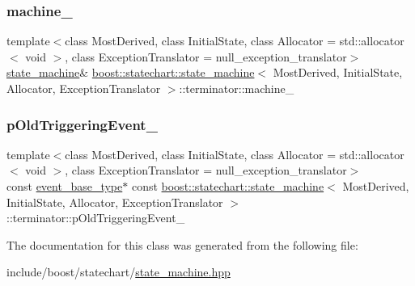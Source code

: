 \mbox{\label{classboost_1_1statechart_1_1state__machine_1_1terminator_abd7df485f3f9ddb47ebe9f33c272da87}} 
\subsubsection{\texorpdfstring{machine\+\_\+}{machine\_}}
{\footnotesize\ttfamily template$<$class Most\+Derived, class Initial\+State, class Allocator = std\+::allocator$<$ void $>$, class Exception\+Translator = null\+\_\+exception\+\_\+translator$>$ \\
\mbox{\hyperlink{classboost_1_1statechart_1_1state__machine}{state\+\_\+machine}}\& \mbox{\hyperlink{classboost_1_1statechart_1_1state__machine}{boost\+::statechart\+::state\+\_\+machine}}$<$ Most\+Derived, Initial\+State, Allocator, Exception\+Translator $>$\+::terminator\+::machine\+\_\+\hspace{0.3cm}{\ttfamily [private]}}

\mbox{\label{classboost_1_1statechart_1_1state__machine_1_1terminator_ac0daef6caf31d033aeeb43bedd491969}} 
\subsubsection{\texorpdfstring{p\+Old\+Triggering\+Event\+\_\+}{pOldTriggeringEvent\_}}
{\footnotesize\ttfamily template$<$class Most\+Derived, class Initial\+State, class Allocator = std\+::allocator$<$ void $>$, class Exception\+Translator = null\+\_\+exception\+\_\+translator$>$ \\
const \mbox{\hyperlink{classboost_1_1statechart_1_1state__machine_adb0e98d6d780a0977209fa7389b20bcd}{event\+\_\+base\+\_\+type}}$\ast$ const \mbox{\hyperlink{classboost_1_1statechart_1_1state__machine}{boost\+::statechart\+::state\+\_\+machine}}$<$ Most\+Derived, Initial\+State, Allocator, Exception\+Translator $>$\+::terminator\+::p\+Old\+Triggering\+Event\+\_\+\hspace{0.3cm}{\ttfamily [private]}}



The documentation for this class was generated from the following file\+:\begin{DoxyCompactItemize}
\item 
include/boost/statechart/\mbox{\hyperlink{state__machine_8hpp}{state\+\_\+machine.\+hpp}}\end{DoxyCompactItemize}
